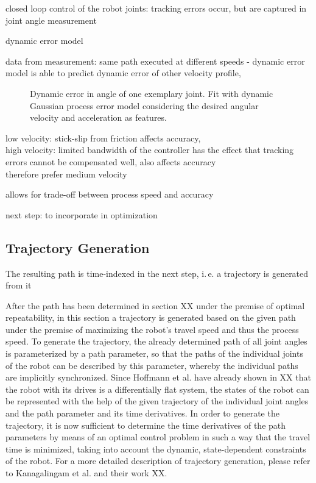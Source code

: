 \documentclass[5p,times,procedia]{elsarticle}
\begin{document}
closed loop control of the robot joints: tracking errors occur, but are captured in joint angle measurement

dynamic error model

data from measurement: same path executed at different speeds - dynamic error model is able to predict dynamic error of other velocity profile,

\begin{figure}[h]
	\centering
	
	\caption{Dynamic error in angle of one exemplary joint. Fit with dynamic Gaussian process error model considering the desired angular velocity and acceleration as features.}
	\label{fig:error_sources}
\end{figure}

low velocity: stick-slip from friction affects accuracy,\\
high velocity: limited bandwidth of the controller has the effect that tracking errors cannot be compensated well, also affects accuracy \\
therefore prefer medium velocity

allows for trade-off between process speed and accuracy



next step: to incorporate in optimization

\subsection{Trajectory Generation}
The resulting path is time-indexed in the next step, i.\,e. a trajectory is generated from it

After the path has been determined in section XX under the premise of optimal repeatability, in this section a trajectory is generated based on the given path under the premise of maximizing the robot’s travel speed and thus the process speed. To generate the trajectory, the already determined path of all joint angles is parameterized by a path parameter, so that the paths of the individual joints of the robot can be described by this parameter, whereby the individual paths are implicitly synchronized. Since Hoffmann et al. have already shown in XX that the robot with its drives is a differentially flat system, the states of the robot can be represented with the help of the given trajectory of the individual joint angles and the path parameter and its time derivatives. In order to generate the trajectory, it is now sufficient to determine the time derivatives of the path parameters by means of an optimal control problem in such a way that the travel time is minimized, taking into account the dynamic, state-dependent constraints of the robot.  For a more detailed description of trajectory generation, please refer to Kanagalingam et al. and their work XX.  
\end{document}
